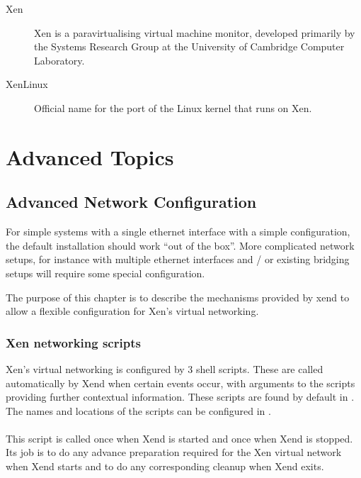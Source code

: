\documentclass[11pt,twoside,final,openright]{xenstyle}
\begin{document}
{\begin{description}
\item[Xen]                 Xen is a paravirtualising virtual machine
                           monitor, developed primarily by the
                           Systems Research Group at the University
                           of Cambridge Computer Laboratory.

\item[XenLinux]            Official name for the port of the Linux kernel
                           that runs on Xen.

\end{description}

\part{Advanced Topics}

\chapter{Advanced Network Configuration}

For simple systems with a single ethernet interface with a simple
configuration, the default installation should work ``out of the
box''.  More complicated network setups, for instance with multiple
ethernet interfaces and / or existing bridging setups will require
some special configuration.

The purpose of this chapter is to describe the mechanisms provided by
xend to allow a flexible configuration for Xen's virtual networking.

\section{Xen networking scripts}

Xen's virtual networking is configured by 3 shell scripts.  These are
called automatically by Xend when certain events occur, with arguments
to the scripts providing further contextual information.  These
scripts are found by default in .  The names and
locations of the scripts can be configured in .

\subsection{}

This script is called once when Xend is started and once when Xend is
stopped.  Its job is to do any advance preparation required for the
Xen virtual network when Xend starts and to do any corresponding
cleanup when Xend exits.

}
\end{document}

